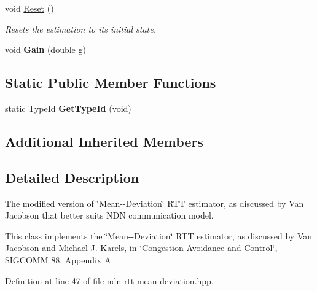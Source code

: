 \begin{DoxyCompactItemize}
\item 
void \hyperlink{classns3_1_1ndn_1_1RttMeanDeviation_ac1abf1a3e9fb761a25a640a010edefaf}{Reset} ()\hypertarget{classns3_1_1ndn_1_1RttMeanDeviation_ac1abf1a3e9fb761a25a640a010edefaf}{}\label{classns3_1_1ndn_1_1RttMeanDeviation_ac1abf1a3e9fb761a25a640a010edefaf}

\begin{DoxyCompactList}\small\item\em Resets the estimation to its initial state. \end{DoxyCompactList}\item 
void {\bfseries Gain} (double g)\hypertarget{classns3_1_1ndn_1_1RttMeanDeviation_a453ecc5c1950669856aae6970032ca37}{}\label{classns3_1_1ndn_1_1RttMeanDeviation_a453ecc5c1950669856aae6970032ca37}

\end{DoxyCompactItemize}
\subsection*{Static Public Member Functions}
\begin{DoxyCompactItemize}
\item 
static Type\+Id {\bfseries Get\+Type\+Id} (void)\hypertarget{classns3_1_1ndn_1_1RttMeanDeviation_abb003c5ae613753243e34c12530c34d4}{}\label{classns3_1_1ndn_1_1RttMeanDeviation_abb003c5ae613753243e34c12530c34d4}

\end{DoxyCompactItemize}
\subsection*{Additional Inherited Members}


\subsection{Detailed Description}
The modified version of \char`\"{}\+Mean-\/-\/\+Deviation\char`\"{} R\+TT estimator, as discussed by Van Jacobson that better suits N\+DN communication model. 

This class implements the \char`\"{}\+Mean-\/-\/\+Deviation\char`\"{} R\+TT estimator, as discussed by Van Jacobson and Michael J. Karels, in \char`\"{}\+Congestion Avoidance and Control\char`\"{}, S\+I\+G\+C\+O\+MM 88, Appendix A 

Definition at line 47 of file ndn-\/rtt-\/mean-\/deviation.\+hpp.



